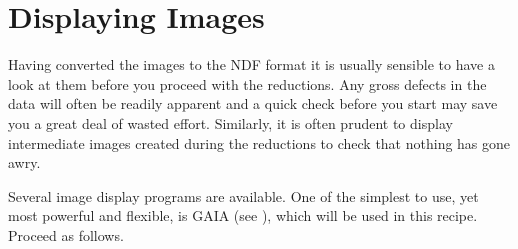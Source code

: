 \documentclass[twoside,11pt]{starlink}
\begin{document}
\newpage
\section{\label{DISPLAY}Displaying Images}

Having converted the images to the NDF format it is usually sensible
to have a look at them before you proceed with the reductions.  Any gross
defects in the data will often be readily apparent and a quick check
before you start may save you a great deal of wasted effort.  Similarly,
it is often prudent to display intermediate images created during the
reductions to check that nothing has gone awry.

Several image display programs are available.  One of the simplest to
use, yet most powerful and flexible, is GAIA (see
\/\cite{SUN214}), which will be used in this
recipe.  Proceed as follows.
\end{document}
